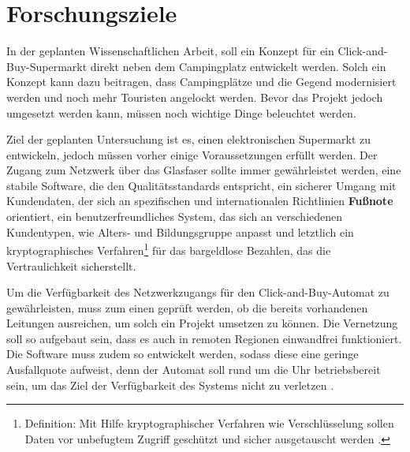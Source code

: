 \section{Forschungsziele}


In der geplanten Wissenschaftlichen Arbeit, soll ein Konzept für ein Click-and-Buy-Supermarkt direkt neben
dem Campingplatz entwickelt werden. Solch ein Konzept kann dazu beitragen, dass Campingplätze und die Gegend
modernisiert werden und noch mehr Touristen angelockt werden. Bevor das Projekt jedoch umgesetzt werden kann, 
müssen noch wichtige Dinge beleuchtet werden. 


Ziel der geplanten Untersuchung ist es, einen elektronischen Supermarkt zu entwickeln, jedoch müssen vorher 
einige Voraussetzungen erfüllt werden. Der Zugang zum Netzwerk über das Glasfaser sollte immer gewährleistet
werden, eine stabile Software, die den Qualitätsstandards entspricht, ein sicherer Umgang mit Kundendaten, 
der sich an spezifischen und internationalen Richtlinien \textbf{Fußnote} orientiert, ein benutzerfreundliches
System, das sich an verschiedenen Kundentypen, wie Alters- und Bildungsgruppe anpasst und letztlich ein 
kryptographisches Verfahren\footnote{Definition: Mit Hilfe kryptographischer Verfahren wie Verschlüsselung sollen
Daten vor unbefugtem Zugriff geschützt und sicher ausgetauscht werden \cite{refart:SLWK}.} für das bargeldlose 
Bezahlen, das die Vertraulichkeit sicherstellt.


Um die Verfügbarkeit des Netzwerkzugangs für den Click-and-Buy-Automat zu gewährleisten, muss zum einen 
geprüft werden, ob die bereits vorhandenen Leitungen ausreichen, um solch ein Projekt umsetzen zu können.
Die Vernetzung soll so aufgebaut sein, dass es auch in remoten Regionen einwandfrei funktioniert. 
Die Software muss zudem so entwickelt werden, sodass diese eine geringe Ausfallquote aufweist, 
denn der Automat soll rund um die Uhr betriebsbereit sein, um das Ziel der Verfügbarkeit des
Systems nicht zu verletzen \cite{refbook:SWIS}.


